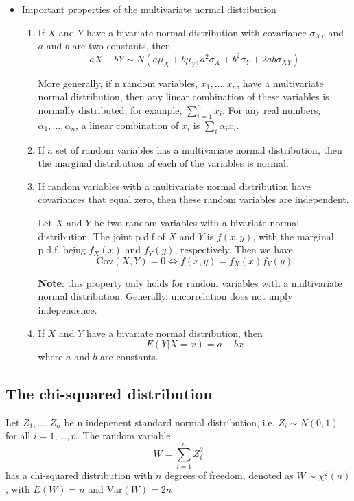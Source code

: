 \documentclass[a4paper,11pt]{article}
\newcommand{\var}{\mathrm{Var}}
\newcommand{\cov}{\mathrm{Cov}}
\begin{document}
\begin{itemize}
\item Important properties of the multivariate normal distribution
\label{sec:orgdb2c586}

\begin{enumerate}
\item If \(X\) and \(Y\) have a bivariate normal distribution with covariance
\(\sigma_{XY}\) and \(a\) and \(b\) are two constants, then
\[
   aX + bY \sim N(a\mu_X + b\mu_Y, a^2\sigma_X + b^2\sigma_Y +
   2ab\sigma_{XY})
   \]

More generally, if n random variables, \(x_1, \ldots, x_n\), have a
multivariate normal distribution, then any linear combination of
these variables is normally distributed, for example, \(\sum_{i=1}^n
   x_i\). For any real numbers, \(\alpha_1, \ldots, \alpha_n\), a linear
combination of \({x_i}\) is \(\sum_i \alpha_i x_i\).

\item If a set of random variables has a multivariate normal
distribution, then the marginal distribution of each of the
variables is normal.

\item If random variables with a multivariate normal distribution have
covariances that equal zero, then these random variables are
independent.

Let \(X\) and \(Y\) be two random variables with a bivariate normal
distribution. The joint p.d.f of \(X\) and \(Y\) is \(f(x, y)\), with the
marginal p.d.f. being \(f_X(x)\) and \(f_Y(y)\), respectively. Then we have
\[ \cov(X, Y) = 0 \Leftrightarrow f(x, y) = f_X(x)f_Y(y) \]

\textbf{Note}: this property only holds for random variables with a
multivariate normal distribution. Generally, uncorrelation does not
imply independence.

\item If \(X\) and \(Y\) have a bivariate normal distribution, then
\[E(Y|X = x) = a + bx \]
where \(a\) and \(b\) are constants.
\end{enumerate}
\end{itemize}

\subsection{The chi-squared distribution}
\label{sec:orge7ec5ce}
Let \(Z_1, \ldots, Z_n\) be n indepenent standard normal distribution,
i.e. \(Z_i \sim N(0, 1)\) for all \(i = 1, \ldots, n\). The random
variable
\[W = \sum_{i=1}^n Z^2_i \]
has a chi-squared distribution with \(n\) degrees of freedom, denoted as
\(W \sim \chi^2(n)\), with \(E(W) = n\) and \(\var(W) = 2n\)
\end{document}
